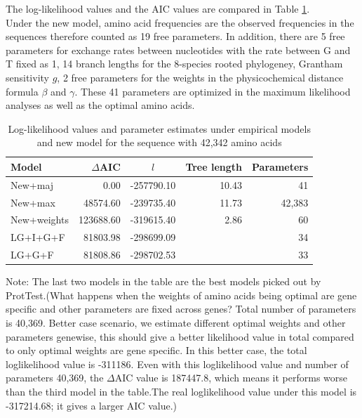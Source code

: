 \noindent The log-likelihood values and the AIC values are compared in Table \ref{table:mle}.\\

\noindent Under the new model, amino acid frequencies are the observed frequencies in the sequences therefore counted as 19 free parameters.
In addition, there are 5 free parameters for exchange rates between nucleotides with the rate between G and T fixed as 1, 14 branch lengths for the 8-species rooted phylogeney, Grantham sensitivity $g$, 2 free parameters for the weights in the physicochemical distance formula $\beta$ and $\gamma$. These 41 parameters are optimized in the maximum likelihood analyses as well as the optimal amino acids.\\

\begin{table}[h]
\begin{center}
\begin{tabular}{l r c r r}
\hline
Model & $\Delta$AIC & $l$ & Tree length & Parameters \\
\hline
New+maj & 0.00 & -257790.10 &  10.43 & 41 \\
New+max & 48574.60 & -239735.40 & 11.73 & 42,383 \\
New+weights & 123688.60 & -319615.40 & 2.86 & 60 \\
LG+I+G+F & 81803.98 & -298699.09 &  & 34\\
LG+G+F & 81808.86 & -298702.53 & & 33 \\
\hline
\end{tabular}
\end{center}
\caption{Log-likelihood values and parameter estimates under empirical models and new model for the sequence with 42,342 amino acids}
\label{table:mle}
\end{table}
{\color{blue} Note: The last two models in the table are the best models picked out by ProtTest.(What happens when the weights of amino acids being optimal are gene specific and other parameters are fixed across genes? Total number of parameters is 40,369.
Better case scenario, we estimate different optimal weights and other parameters genewise, this should give a better likelihood value in total compared to only optimal weights are gene specific.
In this better case, the total loglikelihood value is -311186.
Even with this loglikelihood value and number of parameters 40,369, the $\Delta$AIC value is 187447.8, which means it performs worse than the third model in the table.The real loglikelihood value under this model is -317214.68; it gives a larger AIC value.)} 


